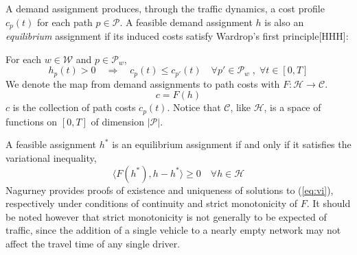 A demand assignment produces, through the traffic dynamics, a cost profile $c_p(t)$ for each path $p\in\mathcal{P}$. 
A feasible demand assignment $h$ is also an \textit{equilibrium} assignment if its induced costs satisfy Wardrop's first principle[HHH]: 

\noindent For each $w\in\mathcal{W}$ and $p\in \mathcal{P}_w$,
\begin{equation}
h_p(t) > 0 \quad
 \Rightarrow \quad c_p(t) \leq c_{p'}(t) \quad \forall p'\in\mathcal{P}_w \;,\; 
 \forall t\in[0,T]
\end{equation}
We denote the map from demand assignments to path costs with $F : \mathcal{H}\rightarrow \mathcal{C}$. 
\begin{equation}
c = F(h)
\end{equation}
$c$ is the collection of path costs $c_p(t)$. Notice that $\mathcal{C}$, like $\mathcal{H}$, is a space of functions on $[0,T]$ of dimension $|\mathcal{P}|$. 


A feasible assignment $h^*$ is an equilibrium assignment if and only if \XXX it satisfies the variational inequality,
\begin{equation}
\label{eq:vi}
\langle F(h^*), h-h^* \rangle \geq 0 \quad \forall h\in\mathcal{H}
\end{equation}
Nagurney \cite{nagurney2013network} provides proofs of existence and uniqueness of solutions to (\ref{eq:vi}), respectively under conditions of continuity and strict monotonicity of $F$. It should be noted however that strict monotonicity is not generally to be expected of traffic, since the addition of a single vehicle to a nearly empty network may not affect the travel time of any single driver.

